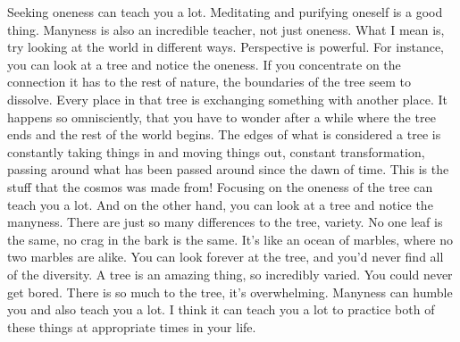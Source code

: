 	Seeking oneness can teach you a lot. Meditating and purifying oneself is a good thing.
Manyness is also an incredible teacher, not just oneness. What I mean is, try looking at the world in different ways. Perspective is powerful.
For instance, you can look at a tree and notice the oneness. If you concentrate on the connection it has to the rest of nature, the boundaries of the tree seem to dissolve. Every place in that tree is exchanging something with another place. It happens so omnisciently, that you have to wonder after a while where the tree ends and the rest of the world begins. The edges of what is considered a tree is constantly taking things in and moving things out, constant transformation, passing around what has been passed around since the dawn of time. This is the stuff that the cosmos was made from! Focusing on the oneness of the tree can teach you a lot.
And on the other hand, you can look at a tree and notice the manyness. There are just so many differences to the tree, variety. No one leaf is the same, no crag in the bark is the same. It's like an ocean of marbles, where no two marbles are alike. You can look forever at the tree, and you'd never find all of the diversity. A tree is an amazing thing, so incredibly varied. You could never get bored. There is so much to the tree, it's overwhelming. Manyness can humble you and also teach you a lot.
I think it can teach you a lot to practice both of these things at appropriate times in your life.

